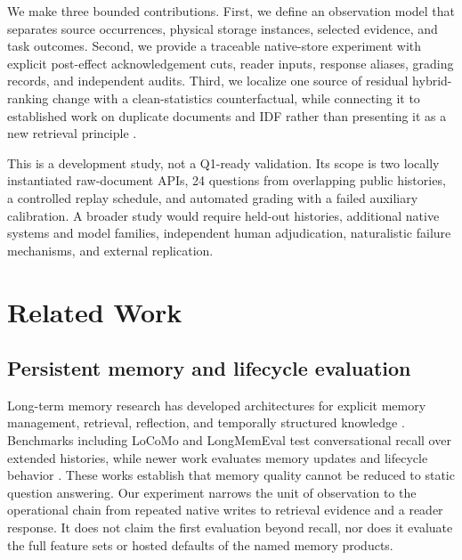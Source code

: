 \documentclass[10pt,letterpaper]{article}
\begin{document}
We make three bounded contributions. First, we define an observation model that separates source occurrences, physical storage instances, selected evidence, and task outcomes. Second, we provide a traceable native-store experiment with explicit post-effect acknowledgement cuts, reader inputs, response aliases, grading records, and independent audits. Third, we localize one source of residual hybrid-ranking change with a clean-statistics counterfactual, while connecting it to established work on duplicate documents and IDF rather than presenting it as a new retrieval principle \citep{frieder2003scalable,robertson2009probabilistic,schelpe2026byte,jain2026cuer,ross2026redundancy,cho2026rare}.

This is a development study, not a Q1-ready validation. Its scope is two locally instantiated raw-document APIs, 24 questions from overlapping public histories, a controlled replay schedule, and automated grading with a failed auxiliary calibration. A broader study would require held-out histories, additional native systems and model families, independent human adjudication, naturalistic failure mechanisms, and external replication.

\section{Related Work}
\subsection{Persistent memory and lifecycle evaluation}
Long-term memory research has developed architectures for explicit memory management, retrieval, reflection, and temporally structured knowledge \citep{packer2023memgpt,zhong2023memorybank,xu2025amem,rasmussen2025zep,latimer2025hindsight}. Benchmarks including LoCoMo and LongMemEval test conversational recall over extended histories, while newer work evaluates memory updates and lifecycle behavior \citep{maharana2024evaluating,wu2024longmemeval,uddin2026memora,wu2026longmemevalv2}. These works establish that memory quality cannot be reduced to static question answering. Our experiment narrows the unit of observation to the operational chain from repeated native writes to retrieval evidence and a reader response. It does not claim the first evaluation beyond recall, nor does it evaluate the full feature sets or hosted defaults of the named memory products.
\end{document}

